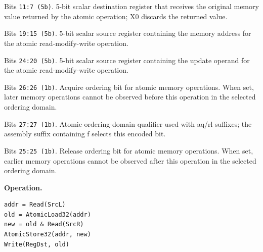 \begin{description}[leftmargin=0.18\linewidth,style=nextline]
\item[\texttt{RegDst}] Bits \texttt{11:7 (5b)}. 5-bit scalar destination register that receives the original memory value returned by the atomic operation; X0 discards the returned value.
\item[\texttt{SrcL}] Bits \texttt{19:15 (5b)}. 5-bit scalar source register containing the memory address for the atomic read-modify-write operation.
\item[\texttt{SrcR}] Bits \texttt{24:20 (5b)}. 5-bit scalar source register containing the update operand for the atomic read-modify-write operation.
\item[\texttt{aq}] Bits \texttt{26:26 (1b)}. Acquire ordering bit for atomic memory operations. When set, later memory operations cannot be observed before this operation in the selected ordering domain.
\item[\texttt{far}] Bits \texttt{27:27 (1b)}. Atomic ordering-domain qualifier used with aq/rl suffixes; the assembly suffix containing f selects this encoded bit.
\item[\texttt{rl}] Bits \texttt{25:25 (1b)}. Release ordering bit for atomic memory operations. When set, earlier memory operations cannot be observed after this operation in the selected ordering domain.
\end{description}
\noindent\textbf{Operation.}\par
\begin{lstlisting}[style=ptoscalarcode]
addr = Read(SrcL)
old = AtomicLoad32(addr)
new = old & Read(SrcR)
AtomicStore32(addr, new)
Write(RegDst, old)
\end{lstlisting}
\Needspace{0.08\textheight}
